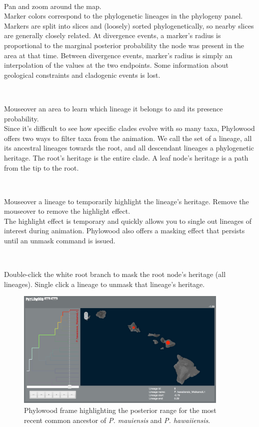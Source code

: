 \documentclass[11pt]{article}
\newcommand{\impmark}{\strut\vadjust{\domark}}
\newcommand{\domark}{%
  \vbox to 0pt{
    \kern-\dp\strutbox
    \smash{\llap{$\rightarrow$\kern1em}}
    \vss
  }%
}
\begin{document}
\noindent \\ \impmark Pan and zoom around the map.\\

Marker colors correspond to the phylogenetic lineages in the phylogeny panel.
Markers are split into slices and (loosely) sorted phylogenetically, so nearby slices are generally closely related.
At divergence events, a marker's radius is proportional to the marginal posterior probability the node was present in the area at that time.
Between divergence events, marker's radius is simply an interpolation of the values at the two endpoints.
Some information about geological constraints and cladogenic events is lost.

\noindent \\ \impmark Mouseover an area to learn which lineage it belongs to and its presence probability. \\

Since it's difficult to see how specific clades evolve with so many taxa, Phylowood offers two ways to filter taxa from the animation.
We call the set of a lineage, all its ancestral lineages towards the root, and all descendant lineages a phylogenetic heritage.
The root's heritage is the entire clade.
A leaf node's heritage is a path from the tip to the root.

\noindent \\ \impmark Mouseover a lineage to temporarily highlight the lineage's heritage. Remove the mouseover to remove the highlight effect. \\

The highlight effect is temporary and quickly allows you to single out lineages of interest during animation.
Phylowood also offers a masking effect that persists until an unmask command is issued.

\noindent \\ \impmark Double-click the white root branch to mask the root node's heritage (all lineages). Single click a lineage to unmask that lineage's heritage. \\

\begin{figure}[H]
\centering
\includegraphics[width=4in]{figures/phw_br19}
\caption{Phylowood frame highlighting the posterior range for the most recent common ancestor of {\it P. mauiensis} and {\it P. hawaiiensis}.}
\end{figure}
\end{document}
